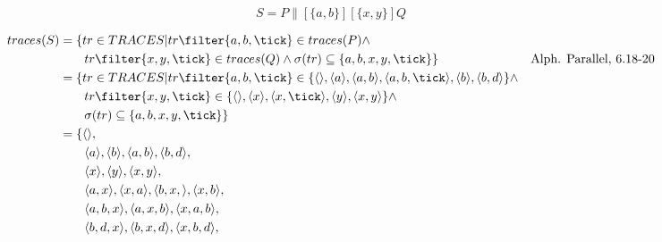 \documentclass{scrreprt}
\begin{document}
\newpage

\begin{equation*}
  S = P \parallel[\{a, b\}][\{x, y\}] Q
\end{equation*}

\begin{align*}
  traces(S) &= \{ tr \in TRACES | tr \filter \{ a, b, \tick \} \in traces(P) \wedge \\
            &\hspace{0.7cm} tr \filter \{ x, y, \tick \} \in traces(Q)
            \wedge \sigma(tr) \subseteq \{ a, b, x, y, \tick \} \} &
            \text{Alph. Parallel, 6.18-20} \\
            &= \{ tr \in TRACES | tr \filter \{ a, b, \tick \} \in  \{ \langle \rangle, \langle a \rangle, \langle a, b \rangle, \langle a, b, \tick \rangle, \langle b \rangle, \langle b, d \rangle \} \wedge \\
            &\hspace{0.7cm} tr \filter \{ x, y, \tick \} \in \{ \langle \rangle, \langle x \rangle, \langle x, \tick \rangle, \langle y \rangle, \langle x, y \rangle \} \wedge \\
            &\hspace{0.7cm} \sigma(tr) \subseteq \{ a, b, x, y, \tick \} \} \\
&= \{ \langle \rangle,\\
&\hspace{0.7cm}\langle a \rangle, \langle b \rangle, \langle a, b \rangle, \langle b, d \rangle,\\
&\hspace{0.7cm}\langle x \rangle, \langle y \rangle, \langle x, y \rangle,\\
&\hspace{0.7cm}\langle a, x \rangle, \langle x, a \rangle,
               \langle b, x, \rangle, \langle x, b \rangle,\\
&\hspace{0.7cm}\langle a, b, x \rangle, \langle a, x, b \rangle, \langle x, a, b \rangle,\\
&\hspace{0.7cm}\langle b, d, x \rangle,  \langle b, x, d \rangle,  \langle x, b, d \rangle,\\

\end{align*}
\end{document}
